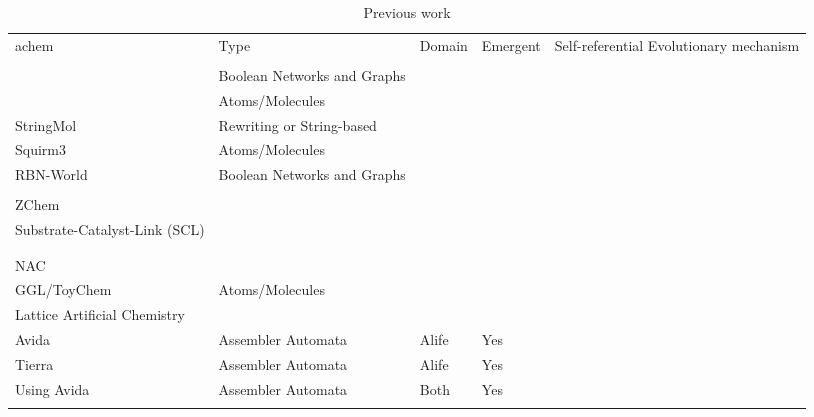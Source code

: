 \begin{sidewaystable}
	\begin{center}
		\scriptsize
		\caption{Previous work}
		\label{tb:previous-work}
		\begin{tabular}{@{}lllll@{}}
			\hline\noalign{\smallskip}
			\Gls{achem}                                                     & Type 	& Domain	& Emergent		& Self-referential Evolutionary mechanism\\ 
			\\ \noalign{\smallskip}
			\hline
			\noalign{\smallskip}
			\cite{Nellis2012}\cite{Nellis2014}								&Boolean Networks and Graphs&&&\\
			\midrule
			\cite{Ducharme2012}                                             &Atoms/Molecules&&&\\
			StringMol \cite{Hickinbotham2012}                             	&Rewriting or String-based&&&\\
			Squirm3 \cite{Hutton2002,Hutton2007,Lucht2012}                	&Atoms/Molecules&&&\\
			RBN-World \cite{Faulconbridge2011}                            	&Boolean Networks and Graphs&&&\\
			\cite{Lenaerts2009}                                             &&&&\\
			ZChem \cite{Tominaga2009}                                     	&&&&\\
			Substrate-Catalyst-Link (SCL) \cite{Varela:1974qd,Suzuki2008} 	&&&&\\
			\cite{Fernando:2008xy,Fernando:2007pf}                             	&&&&\\
			\cite{Gardiner2007}                                                	&&&&\\
			NAC \cite{Suzuki2006}                                         	&&&&\\						
			GGL/ToyChem \cite{Benko2003,Benko2005}                        	&Atoms/Molecules&&&\\
			Lattice Artificial Chemistry \cite{Ono2000,Madina2003}        	&&&&\\
			Avida \cite{Ofria2004}                                  		&Assembler Automata&	Alife&	Yes&\\
			Tierra \cite{Ray1991}                                  			&Assembler Automata&	Alife&	Yes&\\
			Using Avida\cite{Lenski2003}									&Assembler Automata&	Both&	Yes&\\
			\cite{Taylor2001}												&&&&\\

\end{tabular}
\end{center}
\end{sidewaystable}
